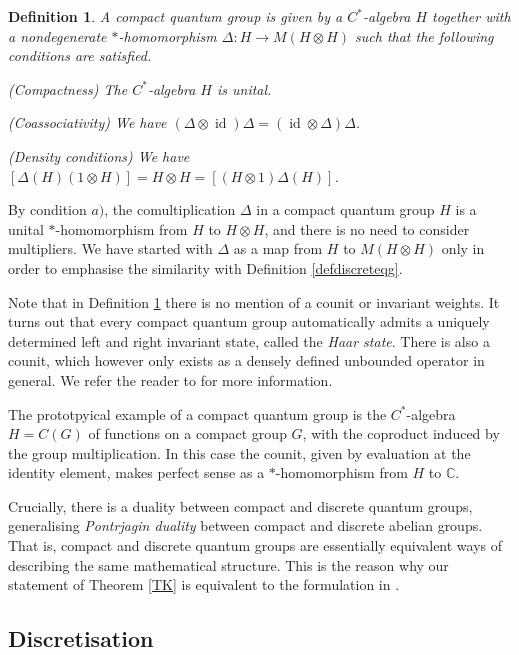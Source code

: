 \documentclass[a4paper]{amsart}
\DeclareMathOperator{\id}{id}
\newenvironment{bnum}
{\begin{list}{}
    {\setlength{\labelwidth}{15pt}
     \setlength{\leftmargin}{\labelwidth}
    }
}
{\end{list}}
\numberwithin{equation}{section}
\theoremstyle{change}
\newtheorem{definition}[theorem]{Definition}
\begin{document}
\begin{definition} \label{defcompactqg}
A compact quantum group is given by a $ C^* $-algebra $ H $ together with a nondegenerate $ * $-homomorphism $ \Delta: H \rightarrow M(H \otimes H) $ such that 
the following conditions are satisfied.  
\begin{bnum} 
\item[a)] (Compactness) The $ C^* $-algebra $ H $ is unital. 
\item[b)] (Coassociativity) We have $ (\Delta \otimes \id)\Delta = (\id \otimes \Delta)\Delta $. 
\item[c)] (Density conditions) We have $ [\Delta(H)(1 \otimes H)] = H \otimes H = [(H \otimes 1)\Delta(H)] $. 
\end{bnum} 
\end{definition} 

By condition $ a) $, the comultiplication $ \Delta $ in a compact quantum group $ H $ is a unital $ * $-homomorphism from $ H $ to $ H \otimes H $, and there is no need to consider multipliers. We have started with $ \Delta $ as a map from $ H $ to $ M(H \otimes H) $ only in order to emphasise the similarity with Definition \ref{defdiscreteqg}.  

Note that in Definition \ref{defcompactqg} there is no mention of a counit or invariant weights. It turns out that every compact quantum group automatically admits a uniquely determined left and right invariant state, called the \emph{Haar state}. There is also a counit, which however only exists as a densely defined unbounded operator in general. We refer the reader to \cite{WORONOWICZ_compactquantumgroups} for more information. 

The prototpyical example of a compact quantum group is the $ C^* $-algebra $ H = C(G) $ of functions on a compact group $ G $, with the coproduct induced by 
the group multiplication. In this case the counit, given by evaluation at the identity element, makes perfect sense as a $ * $-homomorphism from $ H $ to $ \mathbb{C} $. 

Crucially, there is a duality between compact and discrete quantum groups, generalising \emph{Pontrjagin duality} between compact and discrete abelian groups. 
That is, compact and discrete quantum groups are essentially equivalent ways of describing the same mathematical structure. This is the reason why our statement of Theorem \ref{TK} is equivalent to the formulation in \cite{NESHVEYEV_TUSET_compactquantumgroups}. 


\subsection{Discretisation} 
\end{document}
